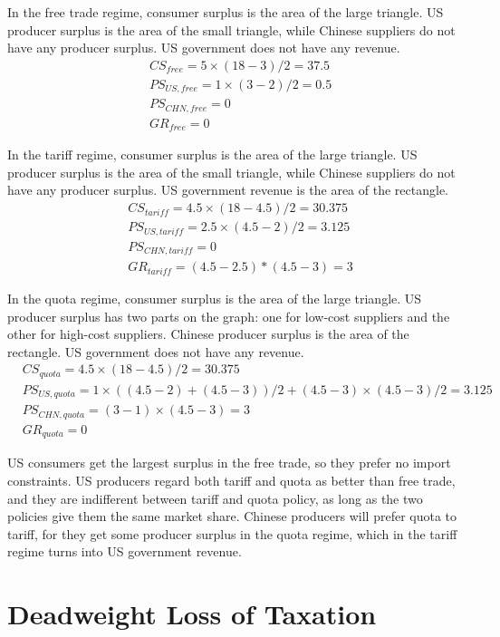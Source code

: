 \documentclass{article}
\begin{document}
In the free trade regime, consumer surplus is the area of the large triangle. US producer surplus is the area of the small triangle, while Chinese suppliers do not have any producer surplus. US government does not have any revenue.
\begin{align*}
	&CS_{free}=5\times(18-3)/2=37.5\\
	&PS_{US,free}=1\times(3-2)/2=0.5\\
	&PS_{CHN,free}=0\\
	&GR_{free}=0
\end{align*}

In the tariff regime, consumer surplus is the area of the large triangle. US producer surplus is the area of the small triangle, while Chinese suppliers do not have any producer surplus. US government revenue is the area of the rectangle.
\begin{align*}
	&CS_{tariff}=4.5\times(18-4.5)/2=30.375\\
	&PS_{US,tariff}=2.5\times(4.5-2)/2=3.125\\
	&PS_{CHN,tariff}=0\\
	&GR_{tariff}=(4.5-2.5)*(4.5-3)=3
\end{align*}


In the quota regime, consumer surplus is the area of the large triangle. US producer surplus has two parts on the graph: one for low-cost suppliers and the other for high-cost suppliers. Chinese producer surplus is the area of the rectangle. US government does not have any revenue.
\begin{align*}
	&CS_{quota}=4.5\times(18-4.5)/2=30.375\\
	&PS_{US,quota}=1\times((4.5-2)+(4.5-3))/2+(4.5-3)\times(4.5-3)/2=3.125\\
	&PS_{CHN,quota}=(3-1)\times(4.5-3)=3\\
	&GR_{quota}=0
\end{align*}

US consumers get the largest surplus in the free trade, so they prefer no import constraints. US producers regard both tariff and quota as better than free trade, and they are indifferent between tariff and quota policy, as long as the two policies give them the same market share. Chinese producers will prefer quota to tariff, for they get some producer surplus in the quota regime, which in the tariff regime turns into US government revenue.

\section{Deadweight Loss of Taxation}
\end{document}
